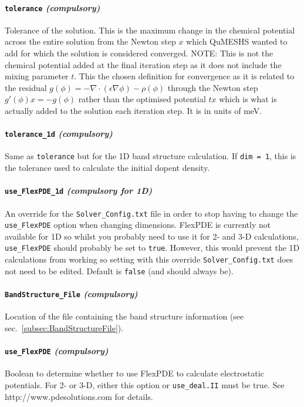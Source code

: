 \documentclass[12pt]{article}
\begin{document}
\paragraph{\texttt{tolerance} \emph{(compulsory)}}
Tolerance of the solution.  This is the maximum change in the chemical potential
across the entire solution from the Newton step $x$ which QuMESHS wanted to add
for which the solution is considered converged.  {\color{red} NOTE:} This is not
the chemical potential added at the final iteration step as it does not include
the mixing parameter $t$.  This the chosen definition for convergence as it is
related to the residual $g(\phi) = - \nabla \cdot ( \epsilon \nabla \phi ) -
\rho (\phi)$ through the Newton step $g' (\phi) x = - g (\phi)$ rather than the
optimised potential $t x$ which is what is actually added to the solution each
iteration step.  It is in units of meV.  

\paragraph{\texttt{tolerance\_1d} \emph{(compulsory)}}
Same as \texttt{tolerance} but for the 1D band structure calculation.  If
\texttt{dim = 1}, this is the tolerance used to calculate the initial dopent
density.

\paragraph{\texttt{use\_FlexPDE\_1d} \emph{(compulsory for 1D)}}
An override for the \texttt{Solver\_Config.txt} file in order to stop having
to change the \texttt{use\_FlexPDE} option when changing dimensions.  FlexPDE
is currently not available for 1D so whilst you probably need to use it for
2- and 3-D calculations, \texttt{use\_FlexPDE} should probably be set to
\texttt{true}.  However, this would prevent the 1D calculations from working
so setting with this override \texttt{Solver\_Config.txt} does not need to be
edited.  Default is \texttt{false} (and should always be).

\paragraph{\texttt{BandStructure\_File} \emph{(compulsory)}}
Location of the file containing the band structure information (see
sec.~\ref{subsec:BandStructureFile}).

\paragraph{\texttt{use\_FlexPDE} \emph{(compulsory)}}
Boolean to determine whether to use FlexPDE to calculate electrostatic potentials.
For 2- or 3-D, either this option or \texttt{use\_deal.II} must be true.  See
http://www.pdesolutions.com for details.
\end{document}

